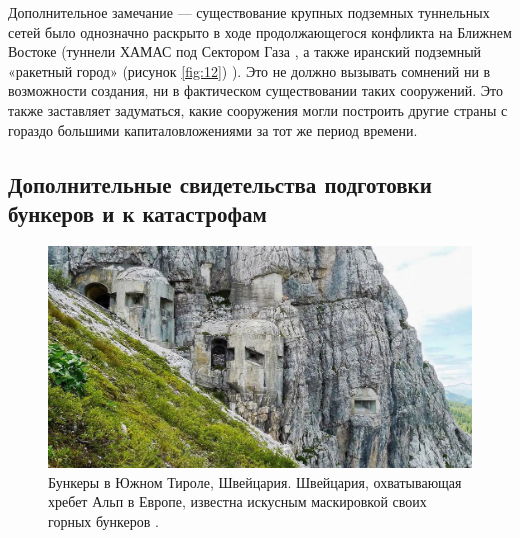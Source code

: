 \documentclass[10pt,twocolumn,letterpaper]{article}
\begin{document}
Дополнительное замечание — существование крупных подземных туннельных сетей было однозначно раскрыто в ходе продолжающегося конфликта на Ближнем Востоке (туннели ХАМАС под Сектором Газа \cite{38}, а также иранский подземный «ракетный город» (рисунок \ref{fig:12}) \cite{39,40}). Это не должно вызывать сомнений ни в возможности создания, ни в фактическом существовании таких сооружений. Это также заставляет задуматься, какие сооружения могли построить другие страны с гораздо большими капиталовложениями за тот же период времени.

\subsection{Дополнительные свидетельства подготовки бункеров и к катастрофам}

\begin{figure}[t]
\begin{center}
   \includegraphics[width=1\linewidth]{tyrol.jpg}
\end{center}
   \caption{Бункеры в Южном Тироле, Швейцария. Швейцария, охватывающая хребет Альп в Европе, известна искусным маскировкой своих горных бункеров \cite{32}.}
\label{fig:7}
\label{fig:onecol}
\end{figure}
\end{document}
